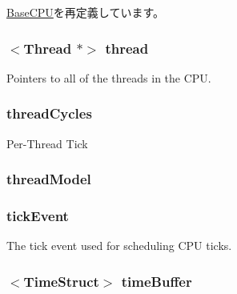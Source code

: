 \hyperlink{classBaseCPU_ab737471139f5a296e5b26e8a0e1b0744}{BaseCPU}を再定義しています。\hypertarget{classInOrderCPU_afe9da004c5a3f37cbb72fa3763d4c0d1}{
\subsubsection[{thread}]{$<${\bf Thread} $\ast$$>$ {\bf thread}}}
\label{classInOrderCPU_afe9da004c5a3f37cbb72fa3763d4c0d1}
Pointers to all of the threads in the CPU. \hypertarget{classInOrderCPU_a102b6d2d89b9006b8ac3bd3fe69284f0}{
\subsubsection[{threadCycles}]{ {\bf threadCycles}}}
\label{classInOrderCPU_a102b6d2d89b9006b8ac3bd3fe69284f0}
Per-\/Thread Tick \hypertarget{classInOrderCPU_af190f1a05b1875acfda59f02e59e2fe0}{
\subsubsection[{threadModel}]{ {\bf threadModel}}}
\label{classInOrderCPU_af190f1a05b1875acfda59f02e59e2fe0}
\hypertarget{classInOrderCPU_aa36b8e894416f0ec98f701ab08f2ac22}{
\subsubsection[{tickEvent}]{ {\bf tickEvent}}}
\label{classInOrderCPU_aa36b8e894416f0ec98f701ab08f2ac22}
The tick event used for scheduling CPU ticks. \hypertarget{classInOrderCPU_ad72b6568a4a40f54d071c31bef16bf2e}{
\subsubsection[{timeBuffer}]{$<${\bf TimeStruct}$>$ {\bf timeBuffer}}}
